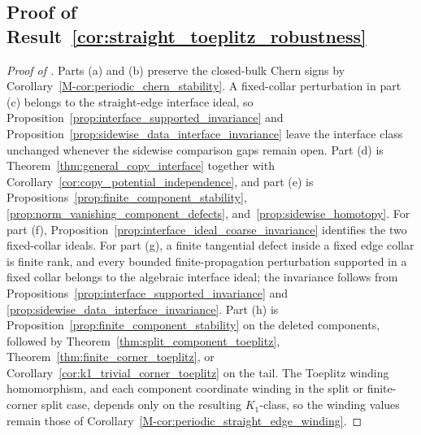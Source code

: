 \documentclass[11pt]{article}
\numberwithin{equation}{section}
\theoremstyle{definition}
\theoremstyle{remark}
\begin{document}
\subsection{Proof of Result~\ref{cor:straight_toeplitz_robustness}}\label{app:proof:cor:straight_toeplitz_robustness}\label{app:proof:cor:finite_defect_tail_toeplitz}
\begin{proof}[Proof of ]
Parts (a) and (b) preserve the closed-bulk Chern signs by
Corollary~\ref{M-cor:periodic_chern_stability}. A fixed-collar perturbation in part (c) belongs to
the straight-edge interface ideal, so Proposition~\ref{prop:interface_supported_invariance} and
Proposition~\ref{prop:sidewise_data_interface_invariance} leave the interface class unchanged
whenever the sidewise comparison gaps remain open. Part (d) is
Theorem~\ref{thm:general_copy_interface} together with
Corollary~\ref{cor:copy_potential_independence}, and part (e) is
Propositions~\ref{prop:finite_component_stability},
\ref{prop:norm_vanishing_component_defects}, and~\ref{prop:sidewise_homotopy}. For part (f),
Proposition~\ref{prop:interface_ideal_coarse_invariance} identifies the two fixed-collar ideals.
For part (g), a finite tangential defect inside a fixed edge collar is finite rank, and every
bounded finite-propagation perturbation supported in a fixed collar belongs to the algebraic
interface ideal; the invariance follows from
Propositions~\ref{prop:interface_supported_invariance} and
\ref{prop:sidewise_data_interface_invariance}. Part (h) is
Proposition~\ref{prop:finite_component_stability} on the deleted components, followed by
Theorem~\ref{thm:split_component_toeplitz}, Theorem~\ref{thm:finite_corner_toeplitz}, or
Corollary~\ref{cor:k1_trivial_corner_toeplitz} on the tail. The
Toeplitz winding homomorphism, and each component coordinate winding in the split or finite-corner
split case, depends
only on the resulting \(K_1\)-class, so the winding values remain those of
Corollary~\ref{M-cor:periodic_straight_edge_winding}.
\end{proof}
\end{document}
